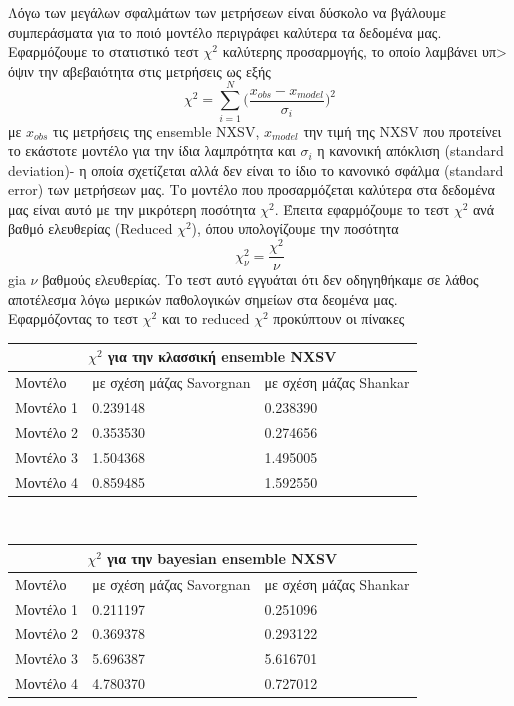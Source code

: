 Λόγω των μεγάλων σφαλμάτων των μετρήσεων είναι δύσκολο να βγάλουμε συμπεράσματα για το ποιό μοντέλο περιγράφει καλύτερα τα δεδομένα μας.\\
Εφαρμόζουμε το στατιστικό τεστ $\chi^2$ καλύτερης προσαρμογής, το οποίο λαμβάνει υπ> όψιν την αβεβαιότητα στις μετρήσεις ως εξής
$$ \chi^2 = \sum_{i=1}^N \Big( \dfrac{x_{obs} - x_{model}}{\sigma_i} \Big)^2$$
με $x_{obs}$ τις μετρήσεις της \textlatin{ensemble NXSV}, $x_{model}$ την τιμή της \textlatin{NXSV} που προτείνει το εκάστοτε μοντέλο για την ίδια λαμπρότητα και $\sigma_i$ η κανονική απόκλιση (\textlatin{standard deviation})- η οποία σχετίζεται αλλά δεν είναι το ίδιο το κανονικό σφάλμα (\textlatin{standard error}) των μετρήσεων μας. Το μοντέλο που προσαρμόζεται καλύτερα στα δεδομένα μας είναι αυτό με την μικρότερη ποσότητα $\chi^2$. Έπειτα εφαρμόζουμε το τεστ $\chi^2$ ανά βαθμό ελευθερίας (\textlatin{Reduced} $\chi^2$), όπου υπολογίζουμε την ποσότητα $$\chi_\nu^2= \frac{\chi^2}{\nu}$$ gia $\nu$ βαθμούς ελευθερίας. Το τεστ αυτό εγγυάται ότι δεν οδηγηθήκαμε σε λάθος αποτέλεσμα λόγω μερικών παθολογικών σημείων στα δεομένα μας.\\
Εφαρμόζοντας το τεστ $\chi^2$ και το \textlatin{reduced} $\chi^2$ προκύπτουν οι πίνακες\\

\begin{tabular}{ |p{3cm}||p{4.5cm}|p{4.5cm}|  }
 \hline
 \multicolumn{3}{|c|}{$\chi^2$ για την κλασσική \textlatin{ensemble NXSV}} \\
 \hline
 Μοντέλο & με σχέση μάζας \textlatin{Savorgnan} & με σχέση μάζας \textlatin{Shankar}\\
 \hline
 Μοντέλο 1 & 0.239148 & 0.238390\\
 Μοντέλο 2 & 0.353530 & 0.274656\\
 Μοντέλο 3 &  1.504368 & 1.495005\\
 Μοντέλο 4 & 0.859485 & 1.592550\\
 \hline
\end{tabular}\\

\begin{tabular}{ |p{3cm}||p{4.5cm}|p{4.5cm}|  }
 \hline
 \multicolumn{3}{|c|}{$\chi^2$ για την \textlatin{bayesian ensemble NXSV}} \\
 \hline
 Μοντέλο & με σχέση μάζας \textlatin{Savorgnan} & με σχέση μάζας \textlatin{Shankar}\\
 \hline
 Μοντέλο 1 &  0.211197 & 0.251096\\
 Μοντέλο 2 & 0.369378 & 0.293122\\
 Μοντέλο 3 &  5.696387 & 5.616701\\
 Μοντέλο 4 & 4.780370 & 0.727012\\
 \hline
\end{tabular}\\    \\

